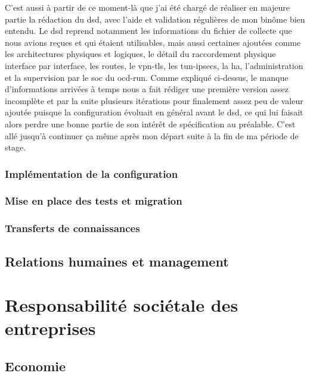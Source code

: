 \documentclass[12pt, oneside, a4paper, titlepage]{report}
\begin{document}
C'est aussi à partir de ce moment-là que j'ai été chargé de réaliser en majeure
partie la rédaction du \acrfull{dsd}, avec l'aide et validation régulières de
mon binôme bien entendu. Le \gls{dsd} reprend notamment les informations du
fichier de collecte que nous avions reçues et qui étaient utilisables, mais
aussi certaines ajoutées comme les architectures physiques et logiques, le
détail du raccordement physique interface par interface, les routes, le
\gls{vpn-tls}, les \glspl{tun-ipsec}, la \acrfull{ha}, l'administration et la
supervision par le \gls{soc} du \gls{ocd-run}. Comme expliqué ci-dessus, le
manque d'informations arrivées à temps nous a fait rédiger une première version
assez incomplète et par la suite plusieurs itérations pour finalement assez peu
de valeur ajoutée puisque la configuration évoluait en général avant le
\gls{dsd}, ce qui lui faisait alors perdre une bonne partie de son intérêt de
spécification au préalable. C'est allé jusqu'à continuer ça même après mon
départ suite à la fin de ma période de stage.

\subsection{Implémentation de la configuration}%
\label{sub:mission::main::implem}

\subsection{Mise en place des tests et migration}%
\label{sub:mission::main::tests}

\subsection{Transferts de connaissances}%
\label{sub:mission::main::trans}


\section{Relations humaines et management}%
\label{sec:mission::rhm}


\chapter{Responsabilité sociétale des entreprises}%
\label{cha:rse}

\section{Economie}%
\label{sec:rse::eco}
\end{document}
